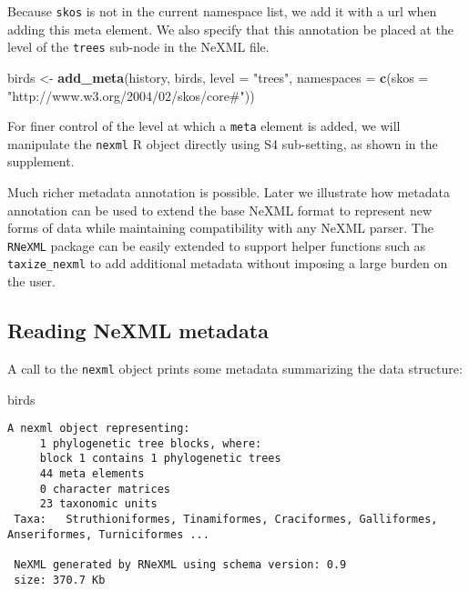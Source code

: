 \documentclass[author-year, review, 11pt]{components/elsarticle} %
\newenvironment{Shaded}{\begin{snugshade}}{\end{snugshade}}
\newcommand{\KeywordTok}[1]{\textcolor[rgb]{0.13,0.29,0.53}{\textbf{{#1}}}}
\newcommand{\DataTypeTok}[1]{\textcolor[rgb]{0.13,0.29,0.53}{{#1}}}
\newcommand{\StringTok}[1]{\textcolor[rgb]{0.31,0.60,0.02}{{#1}}}
\newcommand{\NormalTok}[1]{{#1}}
\begin{document}
Because \texttt{skos} is not in the current namespace list, we add it
with a url when adding this meta element. We also specify that this
annotation be placed at the level of the \texttt{trees} sub-node in the
NeXML file.

\begin{Shaded}
\begin{Highlighting}[]
\NormalTok{birds <-}\StringTok{ }\KeywordTok{add_meta}\NormalTok{(history, }
                \NormalTok{birds, }
                \DataTypeTok{level =} \StringTok{"trees"}\NormalTok{,}
                \DataTypeTok{namespaces =} \KeywordTok{c}\NormalTok{(}\DataTypeTok{skos =} \StringTok{"http://www.w3.org/2004/02/skos/core#"}\NormalTok{))}
\end{Highlighting}
\end{Shaded}

For finer control of the level at which a \texttt{meta} element is
added, we will manipulate the \texttt{nexml} R object directly using S4
sub-setting, as shown in the supplement.

Much richer metadata annotation is possible. Later we illustrate how
metadata annotation can be used to extend the base NeXML format to
represent new forms of data while maintaining compatibility with any
NeXML parser. The \texttt{RNeXML} package can be easily extended to
support helper functions such as \texttt{taxize\_nexml} to add
additional metadata without imposing a large burden on the user.

\subsection{Reading NeXML metadata}\label{reading-nexml-metadata}

A call to the \texttt{nexml} object prints some metadata summarizing the
data structure:

\begin{Shaded}
\begin{Highlighting}[]
\NormalTok{birds}
\end{Highlighting}
\end{Shaded}

\begin{verbatim}
A nexml object representing:
     1 phylogenetic tree blocks, where: 
     block 1 contains 1 phylogenetic trees 
     44 meta elements 
     0 character matrices 
     23 taxonomic units 
 Taxa:   Struthioniformes, Tinamiformes, Craciformes, Galliformes, Anseriformes, Turniciformes ... 

 NeXML generated by RNeXML using schema version: 0.9 
 size: 370.7 Kb 
\end{verbatim}
\end{document}
